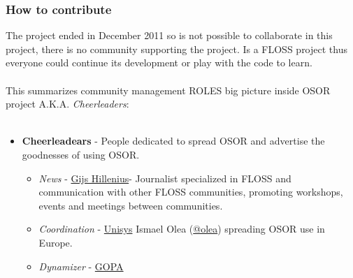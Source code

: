 \subsubsection{ How to contribute} The project ended in December 2011 so is not possible to collaborate in this project, there is no community supporting the project. Is a FLOSS project thus everyone could continue its development or play with the code to learn.
\\
\\ This summarizes community management ROLES big picture inside OSOR project A.K.A. \textit{Cheerleaders}:
\\
\\
\begin{itemize}
	\item \textbf{Cheerleadears} - People dedicated to spread OSOR and advertise the goodnesses of using OSOR.
\begin{itemize}
	\item \textit{News} - \href{https://twitter.com/Sjig}{Gijs Hillenius}\nolinebreak- Journalist specialized in FLOSS and communication with other FLOSS communities, promoting workshops, events and meetings between communities.
	\item \textit{Coordination} - \href{http://www.unisys.com/unisys/}{Unisys} Ismael Olea (\href{https://twitter.com/olea}{@olea}) spreading OSOR use in Europe.
	\item \textit{Dynamizer} - \href{http://www.gopa-cartermill.com/}{GOPA}
\end{itemize}
\end{itemize}